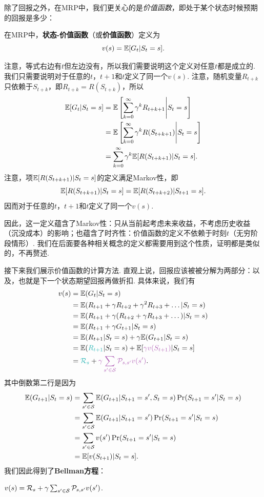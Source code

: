除了回报之外，在MRP中，我们更关心的是\emph{价值函数}，即处于某个状态时候预期的回报是多少：
\begin{definition}[价值函数]
在MRP中，\textbf{状态-价值函数}（或\textbf{价值函数}）定义为
    \[v(s) = \mathbb{E}[G_t|S_t=s].\]
\end{definition}

注意，等式右边有$t$但左边没有，所以我们需要说明这个定义对任意$t$都是成立的. 我们只需要说明对于任意的$t$，$t+1$和$t$定义了同一个$v(s)$. 注意，随机变量$R_{t+k}$只依赖于$S_{t+k}$，即$R_{t+k}=R(S_{t+k})$，所以
\begin{align*}
    \mathbb{E}[G_t|S_t=s] &= \mathbb{E}\left[\sum_{k=0}^\infty \gamma^k R_{t+k+1}\middle|S_t=s\right] \\
    &= \mathbb{E}\left[\sum_{k=0}^\infty \gamma^k R(S_{t+k+1})\middle|S_t=s\right]\\
    &= \sum_{k=0}^\infty \gamma^k \mathbb{E}[R(S_{t+k+1})|S_t=s].
\end{align*}
注意，项$\mathbb{E}[R(S_{t+k+1})|S_t=s]$的定义满足Markov性，即
\[\mathbb{E}[R(S_{t+k+1})|S_t=s]=\mathbb{E}[R(S_{t+k+2})|S_{t+1}=s].\]
因而对于任意的$t$，$t+1$和$t$定义了同一个$v(s)$.

因此，这一定义蕴含了Markov性：只从当前起考虑未来收益，不考虑历史收益（沉没成本）的影响；也蕴含了时齐性：价值函数的定义不依赖于时刻$t$（无穷阶段情形）. 我们在后面要各种相关概念的定义都需要用到这个性质，证明都是类似的，不再赘述.

接下来我们展示价值函数的计算方法. 直观上说，回报应该被被分解为两部分：以及，也就是下一个状态期望回报再做折扣. 具体来说，我们有
\begin{align*}
v(s) &= \E(G_t|S_t=s) \\
    &= \E(R_{t+1}+ \gamma R_{t+2} + \gamma^2 R_{t+3}+\dots | S_t= s) \\
    &= \E(R_{t+1} + \gamma (R_{t+2}+\gamma R_{t+3}+\dots) | S_t = s) \\
    &= \E(R_{t+1} + \gamma G_{t+1} | S_t = s) \\
    &= \E(R_{t+1} | S_t = s) + \gamma \E(G_{t+1} | S_t = s) \\
    &= \E(\contrastlight{R_{t+1}}|S_t=s) + \E[\light{\gamma v(S_{t+1})}|S_t=s]\\
    &= \contrastlight{\mathcal R_s} + \light{\gamma \sum_{s'\in \calS}\calP_{s,s'}v(s')}.
\end{align*}
其中倒数第二行是因为
\begin{align*}
    \mathbb{E}(G_{t+1}|S_t=s) &= \sum_{s'\in \mathcal S}\mathbb{E}(G_{t+1}|S_{t+1}=s',S_t=s)\Pr(S_{t+1}=s'|S_t=s)\\
    &= \sum_{s'\in \mathcal S}\mathbb{E}(G_{t+1}|S_{t+1}=s')\Pr(S_{t+1}=s'|S_t=s)\\
    &= \sum_{s'\in \mathcal S}v(s')\Pr(S_{t+1}=s'|S_t=s)\\
    &=\mathbb{E}[v(S_{t+1})|S_t=s].
\end{align*}
我们因此得到了\textbf{Bellman方程}：
\begin{theorem}[Bellman方程]\label{thm:MRP-Bellman}
    $v(s)=\mathcal R_s + \gamma \sum_{s'\in \mathcal S}\mathcal P_{s,s'}v(s')$.
\end{theorem}

